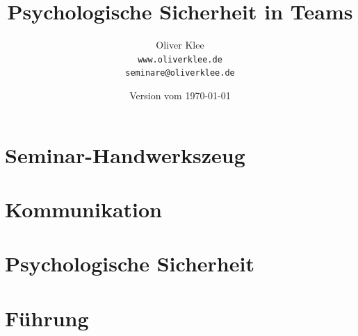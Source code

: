 \documentclass[a4paper,openany,twoside,titlepage,10pt,headsepline]{scrbook}
\title{ Psychologische Sicherheit in Teams }
\author{Oliver Klee\\\texttt{www.oliverklee.de}\\\texttt{seminare@oliverklee.de}}
\date{Version vom \today}
\begin{document}
    \frontmatter

    \maketitle

    \tableofcontents


    \mainmatter


    \chapter{Seminar-Handwerkszeug}
    
    
    


    \chapter{Kommunikation}
    
    
    


    \chapter{Psychologische Sicherheit}
    
    
    
    
    
    
    
    


    \chapter{Führung}
    
    
    
    
    
    
    

    \backmatter

    

    

    \printindex
\end{document}

